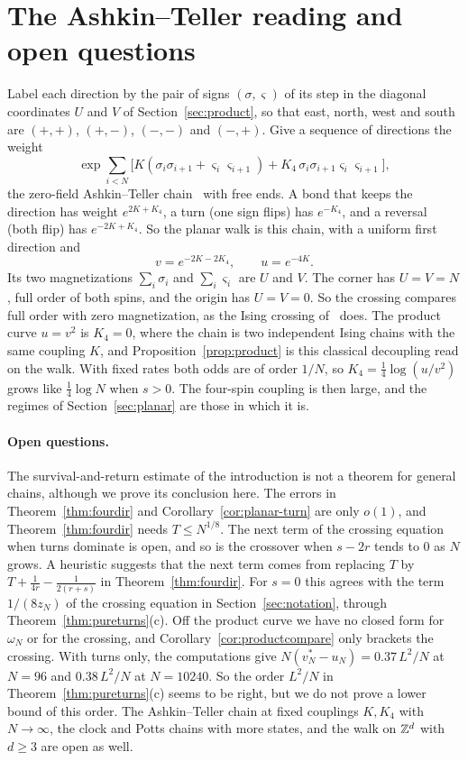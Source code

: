 \section{The Ashkin--Teller reading and open questions}\label{sec:discussion}

Label each direction by the pair of signs $(\sigma,\varsigma)$ of its step in the
diagonal coordinates $U$ and $V$ of Section~\ref{sec:product}, so that east,
north, west and south are $(+,+)$, $(+,-)$, $(-,-)$ and $(-,+)$. Give a
sequence of directions the weight
\[
 \exp\sum_{i<N}\bigl[K(\sigma_i\sigma_{i+1}+\varsigma_i\varsigma_{i+1})
 +K_4\,\sigma_i\sigma_{i+1}\varsigma_i\varsigma_{i+1}\bigr],
\]
the zero-field Ashkin--Teller chain~\cite{ashkinteller1943} with free ends. A
bond that keeps the direction has weight $e^{2K+K_4}$, a turn (one sign flips)
has $e^{-K_4}$, and a reversal (both flip) has $e^{-2K+K_4}$. So the planar walk
is this chain, with a uniform first direction and
\[
 v=e^{-2K-2K_4},\qquad u=e^{-4K}.
\]
Its two magnetizations $\sum_i\sigma_i$ and $\sum_i\varsigma_i$ are $U$ and $V$.
The corner has $U=V=N$, full order of both spins, and the origin has $U=V=0$. So
the crossing compares full order with zero magnetization, as the Ising crossing
of~\cite{paperA} does. The product curve $u=v^2$ is $K_4=0$, where the chain is
two independent Ising chains with the same coupling $K$, and
Proposition~\ref{prop:product} is this classical decoupling read on the walk.
With fixed rates both odds are of order $1/N$, so $K_4=\frac14\log(u/v^2)$
grows like $\frac14\log N$ when $s>0$. The four-spin coupling is then large,
and the regimes of Section~\ref{sec:planar} are those in which it is.

\paragraph{Open questions.}
The survival-and-return estimate of the introduction is not a theorem for
general chains, although we prove its conclusion here. The errors in
Theorem~\ref{thm:fourdir} and Corollary~\ref{cor:planar-turn} are only $o(1)$,
and Theorem~\ref{thm:fourdir} needs $T\le N^{1/8}$. The next term of the
crossing equation when turns dominate is open, and so is the crossover when
$s-2r$ tends to $0$ as $N$ grows. A heuristic suggests that the next term comes
from replacing $T$ by $T+\frac1{4r}-\frac1{2(r+s)}$ in
Theorem~\ref{thm:fourdir}. For $s=0$ this agrees with the term $1/(8z_N)$ of the
crossing equation in Section~\ref{sec:notation}, through
Theorem~\ref{thm:pureturns}(c). Off the product curve we have no closed form for
$\omega_N$ or for the crossing, and Corollary~\ref{cor:productcompare} only brackets
the crossing. With turns only, the computations give $N(v^*_N-u_N)=0.37\,L^2/N$
at $N=96$ and $0.38\,L^2/N$ at $N=10240$. So the order $L^2/N$ in
Theorem~\ref{thm:pureturns}(c) seems to be right, but we do not prove a lower
bound of this order. The Ashkin--Teller chain at fixed couplings $K,K_4$ with
$N\to\infty$, the clock and Potts chains with more states, and the walk on
$\mathbb{Z}^d$ with $d\ge3$ are open as well.
